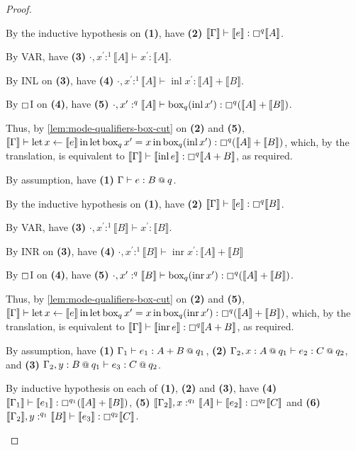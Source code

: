 \documentclass[acmsmall,screen,nonacm]{acmart}
\makeatletter
\DeclareMathOperator{\llet}{\text{let}}
\DeclareMathOperator{\lin}{\text{in}}
\DeclareMathOperator{\bbox}{\text{box}}
\newcommand{\at}{\mathbin{\mbox{\small\ensuremath{@}}}}
\DeclareMathOperator{\inl}{\text{inl}}
\DeclareMathOperator{\inr}{\text{inr}}
\newcommand{\tee}{\vdash}
\newcommand{\sem}[1]{\llbracket #1 \rrbracket}
\makeatother
\begin{document}
\begin{proof}
\begin{description}
    By the inductive hypothesis on \textbf{(1)}, have \textbf{(2)} $\sem{\Gamma} \tee \sem{e} : \boxempty^q \sem{A}$.
    
    By VAR, have \textbf{(3)} $\cdot, x^\prime :^1 \sem{A} \tee x^\prime : \sem{A}$.
    
    By INL on \textbf{(3)}, have \textbf{(4)} $\cdot, x^\prime :^1 \sem{A} \tee \inl x^\prime : \sem{A} + \sem{B}$.

    By $\boxempty$I on \textbf{(4)}, have \textbf{(5)} $\cdot, x^\prime :^q \sem{A} \tee \bbox_q(\inl x^\prime) : \boxempty^q(\sem{A} + \sem{B})$.

    Thus, by \ref{lem:mode-qualifiers-box-cut} on \textbf{(2)} and \textbf{(5)}, $\sem{\Gamma} \tee \llet x \leftarrow \sem{e} \lin \llet \bbox_q x^\prime = x \lin \bbox_q (\inl x^\prime) : \boxempty^q (\sem{A} + \sem{B})$, which, by the translation, is equivalent to $\sem{\Gamma} \tee \sem{\inl e} : \boxempty^q \sem{A + B}$, as required.
    \\
    \item[Case INR.] 
    By assumption, have \textbf{(1)} $\Gamma \tee e : B \at q$.
    
    By the inductive hypothesis on \textbf{(1)}, have \textbf{(2)} $\sem{\Gamma} \tee \sem{e} : \boxempty^q \sem{B}$.
    
    By VAR, have \textbf{(3)} $\cdot, x^\prime :^1 \sem{B} \tee x^\prime : \sem{B}$.
    
    By INR on \textbf{(3)}, have \textbf{(4)} $\cdot, x^\prime :^1 \sem{B} \tee \inr x^\prime : \sem{A} + \sem{B}$
    
    By $\boxempty$I on \textbf{(4)}, have \textbf{(5)} $\cdot, x^\prime :^q \sem{B} \tee \bbox_q(\inr x^\prime) : \boxempty^q(\sem{A} + \sem{B})$.

    Thus, by \ref{lem:mode-qualifiers-box-cut} on \textbf{(2)} and \textbf{(5)}, $\sem{\Gamma} \tee \llet x \leftarrow \sem{e} \lin \llet \bbox_q x^\prime = x \lin \bbox_q (\inr x^\prime) : \boxempty^q (\sem{A} + \sem{B})$, which, by the translation, is equivalent to $\sem{\Gamma} \tee \sem{\inr e} : \boxempty^q \sem{A + B}$, as required.
    \\
    \item[Case CASE.]
    By assumption, have \textbf{(1)} $\Gamma_1 \tee e_1 : A + B \at q_1$, \textbf{(2)} $\Gamma_2, x : A \at q_1 \tee e_2 : C \at q_2$, and \textbf{(3)} $\Gamma_2, y : B \at q_1 \tee e_3 : C \at q_2$.
    
    By inductive hypothesis on each of \textbf{(1)}, \textbf{(2)} and \textbf{(3)}, have \textbf{(4)} $\sem{\Gamma_1} \tee \sem{e_1} : \boxempty^{q_1} (\sem{A} + \sem{B})$, \textbf{(5)} $\sem{\Gamma_2}, x :^{q_1} \sem{A} \tee \sem{e_2} : \boxempty^{q_2} \sem{C}$ and \textbf{(6)} $\sem{\Gamma_2}, y :^{q_1} \sem{B} \tee \sem{e_3} : \boxempty^{q_2} \sem{C}$.


\end{description}
\end{proof}
\end{document}
